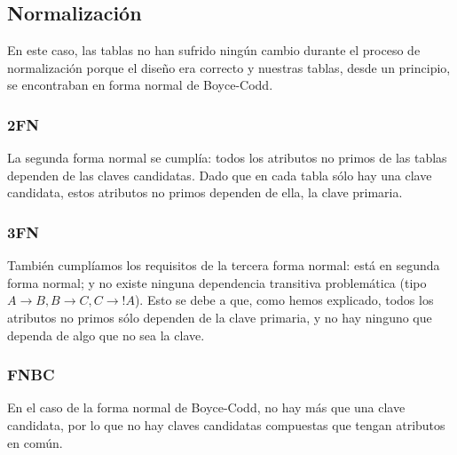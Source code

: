\subsection{Normalización}
En este caso, las tablas no han sufrido ningún cambio durante el proceso de normalización
porque el diseño era correcto y nuestras tablas, desde un principio, se encontraban en
forma normal de Boyce-Codd.

\subsubsection{2FN}
La segunda forma normal se cumplía: todos los atributos no primos de las tablas dependen de las claves candidatas.
Dado que en cada tabla sólo hay una clave candidata, estos atributos no primos dependen de ella, la clave primaria.


\subsubsection{3FN}
También cumplíamos los requisitos de la tercera forma normal: está en segunda forma normal;
y no existe ninguna dependencia transitiva problemática (tipo $A \rightarrow B, B \rightarrow C, C \rightarrow !A$). Esto se debe a
que, como hemos explicado, todos los atributos no primos sólo dependen de la clave primaria, y no
hay ninguno que dependa de algo que no sea la clave.


\subsubsection{FNBC}
En el caso de la forma normal de Boyce-Codd, no hay más que una clave candidata, por lo que no
hay claves candidatas compuestas que tengan atributos en común.
